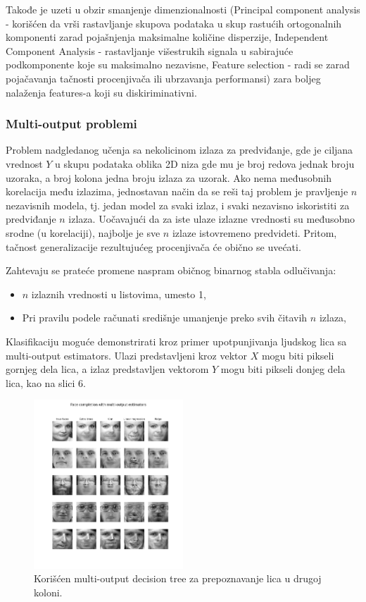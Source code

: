 \documentclass[fontsize=12bp, paper=a4]{scrarticle}
\begin{document}
Takođe je uzeti u obzir smanjenje dimenzionalnosti (Principal component analysis - korišćen da vrši rastavljanje skupova podataka u skup rastućih ortogonalnih komponenti zarad pojašnjenja maksimalne količine disperzije\cite{pca}, Independent Component Analysis - rastavljanje višestrukih signala u sabirajuće podkomponente koje su maksimalno nezavisne\cite{ica}, Feature selection - radi se zarad pojačavanja tačnosti procenjivača ili ubrzavanja performansi\cite{fs}) zara boljeg nalaženja features-a koji su diskiriminativni.

\subsubsection{Multi-output problemi}
\label{sec:mop}
Problem nadgledanog učenja sa nekolicinom izlaza za predviđanje, gde je ciljana vrednost $Y$ u skupu podataka oblika 2D niza gde mu je broj redova jednak broju uzoraka, a broj kolona jedna broju izlaza za uzorak.
Ako nema međusobnih korelacija među izlazima, jednostavan način da se reši taj problem je pravljenje $n$ nezavisnih modela, tj. jedan model za svaki izlaz, i svaki nezavisno iskoristiti za predviđanje $n$ izlaza. Uočavajući da za iste ulaze izlazne vrednosti su međusobno srodne (u korelaciji), najbolje je sve $n$ izlaze istovremeno predvideti.
Pritom, tačnost generalizacije rezultujućeg procenjivača će obično se uvećati.

Zahtevaju se prateće promene naspram običnog binarnog stabla odlučivanja:
\begin{itemize}
    \item $n$ izlaznih vrednosti u listovima, umesto 1,
    \item Pri pravilu podele računati središnje umanjenje preko svih čitavih $n$ izlaza,
\end{itemize}

Klasifikaciju moguće demonstrirati kroz primer upotpunjivanja ljudskog lica sa multi-output estimators. Ulazi predstavljeni kroz vektor $X$ mogu biti pikseli gornjeg dela lica, a izlaz predstavljen vektorom $Y$ mogu biti pikseli donjeg dela lica, kao na slici 6.
\begin{figure}[h!]
    \centering
    \includegraphics[width=0.5\textwidth]{image-4.png}
    \caption{Korišćen multi-output decision tree za prepoznavanje lica u drugoj koloni.}
\end{figure}
\end{document}
